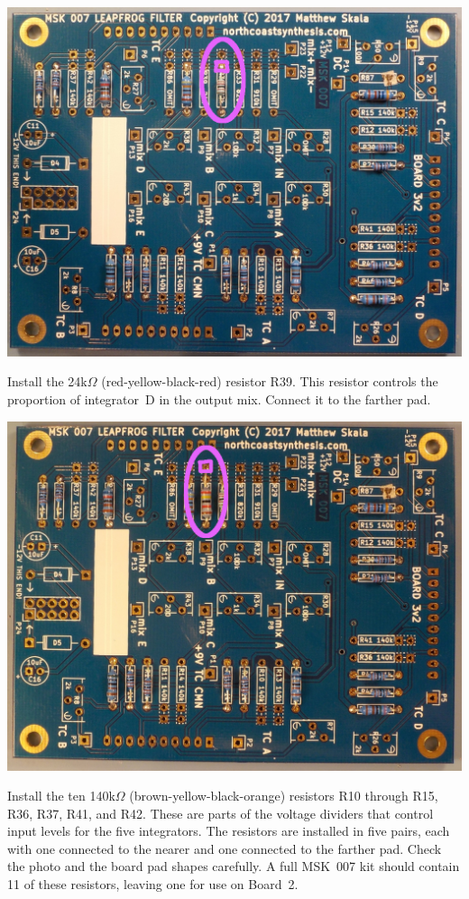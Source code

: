 \nopagebreak
\noindent\includegraphics[width=\linewidth]{res-22k3.jpg}

Install the 24k$\Omega$ (red-yellow-black-red) resistor R39.  This resistor
controls the proportion of integrator~D in the output mix.  Connect it to
the farther pad.

\nopagebreak
\noindent\includegraphics[width=\linewidth]{res-24k3.jpg}

\newpage

Install the ten 140k$\Omega$ (brown-yellow-black-orange) resistors R10
through R15, R36, R37, R41, and R42.  These are parts of the voltage
dividers that control input levels for the five integrators.  The resistors
are installed in five pairs, each with one connected to the nearer and one
connected to the farther pad.  Check the photo and the board pad shapes
carefully.  A full MSK~007 kit should contain 11 of these resistors, leaving
one for use on Board~2.

